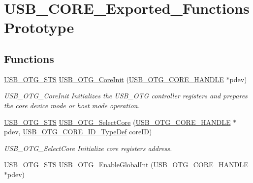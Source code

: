 \hypertarget{group___u_s_b___c_o_r_e___exported___functions_prototype}{\section{U\-S\-B\-\_\-\-C\-O\-R\-E\-\_\-\-Exported\-\_\-\-Functions\-Prototype}
\label{group___u_s_b___c_o_r_e___exported___functions_prototype}
}
\subsection*{Functions}
\begin{DoxyCompactItemize}
\item 
\hyperlink{group___u_s_b___c_o_r_e___exported___types_ga8b6504b9af0662f17515795db0f9c8ed}{U\-S\-B\-\_\-\-O\-T\-G\-\_\-\-S\-T\-S} \hyperlink{group___u_s_b___c_o_r_e___exported___functions_prototype_ga3438ecddea236fa11d27265d13d5fe84}{U\-S\-B\-\_\-\-O\-T\-G\-\_\-\-Core\-Init} (\hyperlink{group___u_s_b___c_o_r_e___exported___types_gaf76054c11eb8a3367907aad7ae700e80}{U\-S\-B\-\_\-\-O\-T\-G\-\_\-\-C\-O\-R\-E\-\_\-\-H\-A\-N\-D\-L\-E} $\ast$pdev)
\begin{DoxyCompactList}\small\item\em U\-S\-B\-\_\-\-O\-T\-G\-\_\-\-Core\-Init Initializes the U\-S\-B\-\_\-\-O\-T\-G controller registers and prepares the core device mode or host mode operation. \end{DoxyCompactList}\item 
\hyperlink{group___u_s_b___c_o_r_e___exported___types_ga8b6504b9af0662f17515795db0f9c8ed}{U\-S\-B\-\_\-\-O\-T\-G\-\_\-\-S\-T\-S} \hyperlink{group___u_s_b___c_o_r_e___exported___functions_prototype_ga3478d2d5f39d97dac404a77d1589275e}{U\-S\-B\-\_\-\-O\-T\-G\-\_\-\-Select\-Core} (\hyperlink{group___u_s_b___c_o_r_e___exported___types_gaf76054c11eb8a3367907aad7ae700e80}{U\-S\-B\-\_\-\-O\-T\-G\-\_\-\-C\-O\-R\-E\-\_\-\-H\-A\-N\-D\-L\-E} $\ast$pdev, \hyperlink{group___u_s_b___d_e_f_i_n_e_s___exported___types_gab31b9dd0bc08bf6120424c20bda8eb7e}{U\-S\-B\-\_\-\-O\-T\-G\-\_\-\-C\-O\-R\-E\-\_\-\-I\-D\-\_\-\-Type\-Def} core\-I\-D)
\begin{DoxyCompactList}\small\item\em U\-S\-B\-\_\-\-O\-T\-G\-\_\-\-Select\-Core Initialize core registers address. \end{DoxyCompactList}\item 
\hyperlink{group___u_s_b___c_o_r_e___exported___types_ga8b6504b9af0662f17515795db0f9c8ed}{U\-S\-B\-\_\-\-O\-T\-G\-\_\-\-S\-T\-S} \hyperlink{group___u_s_b___c_o_r_e___exported___functions_prototype_gafdfd916dd980623896bc39477ed1636e}{U\-S\-B\-\_\-\-O\-T\-G\-\_\-\-Enable\-Global\-Int} (\hyperlink{group___u_s_b___c_o_r_e___exported___types_gaf76054c11eb8a3367907aad7ae700e80}{U\-S\-B\-\_\-\-O\-T\-G\-\_\-\-C\-O\-R\-E\-\_\-\-H\-A\-N\-D\-L\-E} $\ast$pdev)

\end{DoxyCompactItemize}
